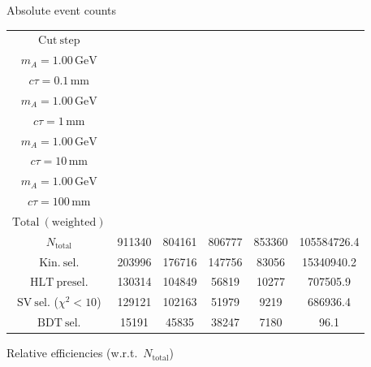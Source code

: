 \documentclass[10pt,a4paper]{article}
\renewcommand{\arraystretch}{1.4}
\begin{document}
{\footnotesize\setlength{\tabcolsep}{4pt}\renewcommand{\arraystretch}{1.05}%
\vspace{12pt}

Absolute event counts

\begin{tabular}{cccccc}
\toprule
$\mathrm{Cut\ step}$ & \shortstack{$m_{\pi}=10\,\mathrm{GeV}$\\$m_{A}=1.00\,\mathrm{GeV}$\\$c\tau=0.1\,\mathrm{mm}$} & \shortstack{$m_{\pi}=10\,\mathrm{GeV}$\\$m_{A}=1.00\,\mathrm{GeV}$\\$c\tau=1\,\mathrm{mm}$} & \shortstack{$m_{\pi}=10\,\mathrm{GeV}$\\$m_{A}=1.00\,\mathrm{GeV}$\\$c\tau=10\,\mathrm{mm}$} & \shortstack{$m_{\pi}=10\,\mathrm{GeV}$\\$m_{A}=1.00\,\mathrm{GeV}$\\$c\tau=100\,\mathrm{mm}$} & \shortstack{$\mathrm{QCD}$\\$\mathrm{Total\ (weighted)}$} \\
\midrule
$N_{\mathrm{total}}$ & 911340 & 804161 & 806777 & 853360 & 105584726.4\\
$\mathrm{Kin.\ sel.}$ & 203996 & 176716 & 147756 & 83056 & 15340940.2\\
$\mathrm{HLT\ presel.}$ & 130314 & 104849 & 56819 & 10277 & 707505.9\\
$\mathrm{SV\ sel.}$ ($\chi^2{<}10$) & 129121 & 102163 & 51979 & 9219 & 686936.4\\
$\mathrm{BDT\ sel.}$ & 15191 & 45835 & 38247 & 7180 & 96.1\\
\bottomrule
\end{tabular}

\vspace{18pt}

Relative efficiencies (w.r.t.\ $N_{\mathrm{total}}$)

}
\end{document}
